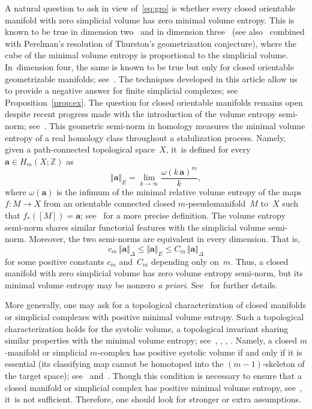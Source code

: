\documentclass[10pt]{amsart}
\newcommand{\bma}{{\boldsymbol{a}}}
\theoremstyle{definition}
\newcommand\Z{{\mathbb Z}}
\begin{document}
A natural question to ask in view of~\eqref{eq:gro} is whether every closed orientable manifold with zero simplicial volume has zero minimal volume entropy.
This is known to be true in dimension two~\cite{katok} and in dimension three~\cite{pieroni} (see also~\cite{AP03} combined with Perelman's resolution of Thurston's geometrization conjecture), where the cube of the minimal volume entropy is proportional to the simplicial volume. In~dimension four, the same is known to be true but only for closed orientable geometrizable manifolds; see~\cite{SS09}.
The techniques developed in this article allow us to provide a negative answer for finite simplicial complexes; see Proposition~\ref{prop:ex}.
The question for closed orientable manifolds remains open despite recent progress made with the introduction of the volume entropy semi-norm; see~\cite{BS}.
This geometric semi-norm in homology measures the minimal volume entropy of a real homology class throughout a stabilization process.
Namely, given a path-connected topological space~$X$, it~is defined for every $\bma \in H_m(X;\Z)$ as
\begin{equation*}%
\Vert \bma \Vert_E = \lim_{k \to \infty} \frac{\omega(k \, \bma)^m}{k},
\end{equation*}
where $\omega(\bma)$ is the infimum of the minimal relative volume entropy of the maps \hbox{$f:M \to X$} from an orientable connected closed $m$\nobreakdash-pseudomanifold~$M$ to~$X$ such that $f_*([M])=\bma$; see~\cite{BS} for a more precise definition.
The volume entropy semi-norm shares similar functorial features with the simplicial volume semi-norm.
Moreover, the two semi-norms are equivalent in every dimension.
That is,
\begin{equation} \label{eq:BS}
c_m \, \Vert \bma \Vert_\Delta \leq \Vert \bma \Vert_E \leq C_m \, \Vert \bma \Vert_\Delta
\end{equation}
for some positive constants $c_m$ and~$C_m$ depending only on~$m$.
Thus, a closed manifold with zero simplicial volume has zero volume entropy semi-norm, but its minimal volume entropy may be nonzero \emph{a priori}.
See~\cite{BS} for further details.

More generally, one may ask for a topological characterization of closed manifolds or simplicial complexes with positive minimal volume entropy.
Such a topological characterization holds for the systolic volume, a topological invariant sharing similar properties with the minimal volume entropy; see~\cite{B93}, \cite{B06}, \cite{B08}, \cite{Brunnbauer08}.
Namely, a closed $m$\nobreakdash-manifold or simplicial $m$\nobreakdash-complex has positive systolic volume if and only if it is essential (\ie its classifying map cannot be homotoped into the $(m-1)$-skeleton of the target space); see~\cite{gro83} and~\cite{B93}.
Though this condition is necessary to ensure that a closed manifold or simplicial complex has positive minimal volume entropy, see~\cite{B93}, it~is not sufficient.
Therefore, one should look for stronger or extra assumptions.
\end{document}
